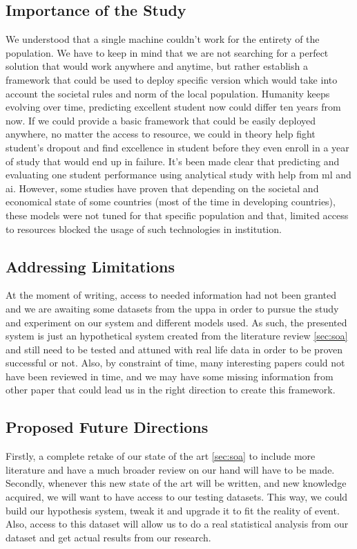 \documentclass[../main.tex]{subfiles}
\begin{document}
\subsection{Importance of the Study}
We understood that a single machine couldn't work for the entirety of the population. We have to keep in mind that we are not searching for a perfect solution that would work anywhere and anytime, but rather establish a framework that could be used to deploy specific version which would take into account the societal rules and norm of the local population. Humanity keeps evolving over time, predicting excellent student now could differ ten years from now. 
If we could provide a basic framework that could be easily deployed anywhere, no matter the access to resource, we could in theory help fight student's dropout and find excellence in student before they even enroll in a year of study that would end up in failure.
It's been made clear that predicting and evaluating one student performance using analytical study with help from \acrshort{ml} and \acrshort{ai}. However, some studies have proven that depending on the societal and economical state of some countries (most of the time in developing countries), these models were not tuned for that specific population and that, limited access to resources blocked the usage of such technologies in institution.

\subsection{Addressing Limitations}
At the moment of writing, access to needed information had not been granted and we are awaiting some datasets from the \acrfull{uppa} in order to pursue the study and experiment on our system and different models used. 
As such, the presented system is just an hypothetical system created from the literature review \ref{sec:soa} and still need to be tested and attuned with real life data in order to be proven successful or not.
Also, by constraint of time, many interesting papers could not have been reviewed in time, and we may have some missing information from other paper that could lead us in the right direction to create this framework.


\subsection{Proposed Future Directions}
Firstly, a complete retake of our state of the art \ref{sec:soa} to include more literature and have a much broader review on our hand will have to be made. 
Secondly, whenever this new state of the art will be written, and new knowledge acquired, we will want to have access to our testing datasets. This way, we could build our hypothesis system, tweak it and upgrade it to fit the reality of event. 
Also, access to this dataset will allow us to do a real statistical analysis from our dataset and get actual results from our research.
\end{document}
